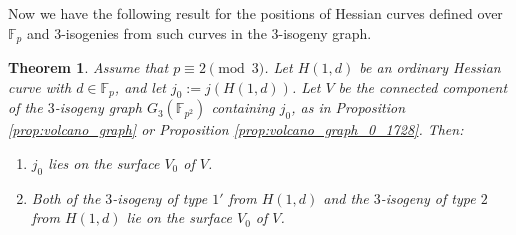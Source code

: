 \documentclass{article}
\newtheorem{theorem}{Theorem}[section]
\theoremstyle{definition}
\newcommand{\FF}{\mathbb{F}}
\begin{document}
Now we have the following result for the positions of Hessian curves defined over $\FF_p$ and $3$-isogenies from such curves in the $3$-isogeny graph.

\begin{theorem}
\label{thm:surface_2_mod_3}
Assume that $p \equiv 2 \pmod{3}$.
Let $H(1,d)$ be an ordinary Hessian curve with $d \in \FF_p$, and let $j_0 := j(H(1,d))$.
Let $V$ be the connected component of the $3$-isogeny graph $G_3(\FF_{p^2})$ containing $j_0$, as in Proposition \ref{prop:volcano_graph} or Proposition \ref{prop:volcano_graph_0_1728}.
Then:
\begin{enumerate}
\item \label{thm:surface_2_mod_3:item:1}
$j_0$ lies on the surface $V_0$ of $V$.
\item \label{thm:surface_2_mod_3:item:2}
Both of the $3$-isogeny of type $1'$ from $H(1,d)$ and the $3$-isogeny of type $2$ from $H(1,d)$ lie on the surface $V_0$ of $V$.
\end{enumerate}
\end{theorem}
\end{document}
